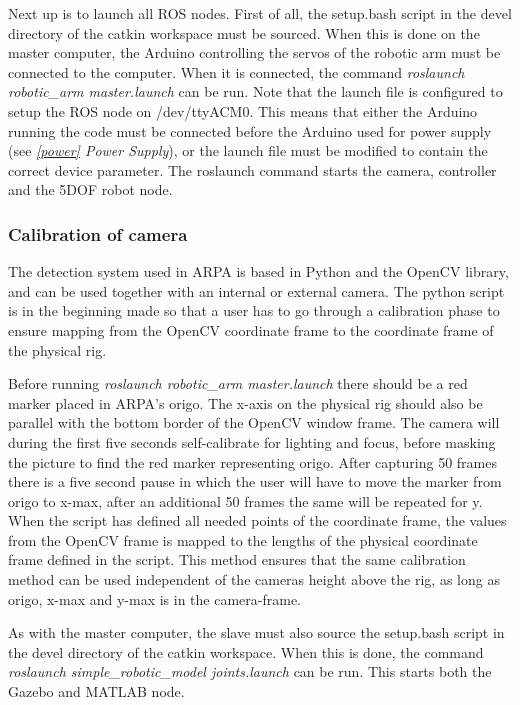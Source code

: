 \documentclass[11pt,a4paper, titlepage]{article}
\begin{document}
	Next up is to launch all ROS nodes. First of all, the setup.bash script in the devel directory of the catkin workspace must be sourced. When this is done on the master computer, the Arduino controlling the servos of the robotic arm must be connected to the computer. When it is connected, the command \textit{roslaunch robotic\_arm master.launch} can be run. Note that the launch file is configured to setup the ROS node on /dev/ttyACM0. This means that either the Arduino running the code must be connected before the Arduino used for power supply (see \textit{\ref{power} Power Supply}), or the launch file must be modified to contain the correct device parameter. The roslaunch command starts the camera, controller and the 5DOF robot node. 
	
\subsubsection{Calibration of camera}
\label{calibratecam}
The detection system used in ARPA is based in Python and the OpenCV library, and can be used together with an internal or external camera. The python script is in the beginning made so that a user has to go through a calibration phase to ensure mapping from the OpenCV coordinate frame to the coordinate frame of the physical rig.

Before running \textit{roslaunch robotic\_arm master.launch} there should be a red marker placed in ARPA's origo. The x-axis on the physical rig should also be parallel with the bottom border of the OpenCV window frame. The camera will during the first five seconds self-calibrate for lighting and focus, before masking the picture to find the red marker representing origo. After capturing 50 frames there is a five second pause in which the user will have to move the marker from origo to x-max, after an additional 50 frames the same will be repeated for y. When the script has defined all needed points of the coordinate frame, the values from the OpenCV frame is mapped to the lengths of the physical coordinate frame defined in the script. This method ensures that the same calibration method can be used independent of the cameras height above the rig, as long as origo, x-max and y-max is in the camera-frame.
	
	As with the master computer, the slave must also source the setup.bash script in the devel directory of the catkin workspace. When this is done, the command \textit{roslaunch simple\_robotic\_model joints.launch} can be run. This starts both the Gazebo and MATLAB node.
	
\end{document}
